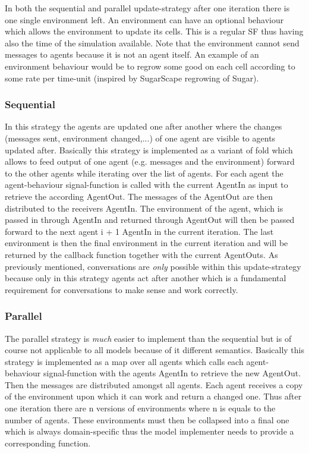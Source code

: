 In both the sequential and parallel update-strategy after one iteration there is one single environment left. An environment can have an optional behaviour which allows the environment to update its cells. This is a regular SF thus having also the time of the simulation available. Note that the environment cannot send messages to agents because it is not an agent itself. An example of an environment behaviour would be to regrow some good on each cell according to some rate per time-unit (inspired by SugarScape regrowing of Sugar).

\subsubsection{Sequential}
In this strategy the agents are updated one after another where the changes (messages sent, environment changed,...) of one agent are visible to agents updated after. Basically this strategy is implemented as a variant of fold which allows to feed output of one agent (e.g. messages and the environment) forward to the other agents while iterating over the list of agents. For each agent the agent-behaviour signal-function is called with the current AgentIn as input to retrieve the according AgentOut. The messages of the AgentOut are then distributed to the receivers AgentIn.
The environment of the agent, which is passed in through AgentIn and returned through AgentOut will then be passed forward to the next agent i + 1 AgentIn in the current iteration. The last environment is then the final environment in the current iteration and will be returned by the callback function together with the current AgentOuts.
As previously mentioned, conversations are \textit{only} possible within this update-strategy because only in this strategy agents act after another which is a fundamental requirement for conversations to make sense and work correctly.

\subsubsection{Parallel}
The parallel strategy is \textit{much} easier to implement than the sequential but is of course not applicable to all models because of it different semantics. Basically this strategy is implemented as a map over all agents which calls each agent-behaviour signal-function with the agents AgentIn to retrieve the new AgentOut. Then the messages are distributed amongst all agents.
Each agent receives a copy of the environment upon which it can work and return a changed one. Thus after one iteration there are n versions of environments where n is equals to the number of agents. These environments must then be collapsed into a final one which is always domain-specific thus the model implementer needs to provide a corresponding function.


